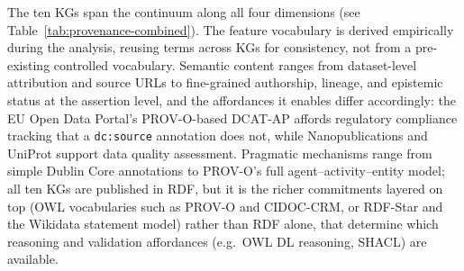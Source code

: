\documentclass[runningheads]{llncs}
\newenvironment{inboth}{}{}
\begin{document}
\begin{inboth}
\begin{sloppypar} %
The ten KGs span the continuum along all four dimensions (see Table~\ref{tab:provenance-combined}).
The feature vocabulary is derived empirically during the analysis, reusing terms across KGs for consistency, not from a pre-existing controlled vocabulary.
Semantic content ranges from dataset-level attribution and source URLs to fine-grained authorship, lineage, and epistemic status at the assertion level, and the affordances it enables differ accordingly: the EU Open Data Portal's PROV-O-based DCAT-AP affords regulatory compliance tracking that a \texttt{dc:source} annotation does not, while Nanopublications and UniProt support data quality assessment.
Pragmatic mechanisms range from simple Dublin Core annotations to PROV-O's full agent--activity--entity model; all ten KGs are published in RDF, but it is the richer commitments layered on top (OWL vocabularies such as PROV-O and CIDOC-CRM, or RDF-Star and the Wikidata statement model) rather than RDF alone, that determine which reasoning and validation affordances (e.g.\ OWL DL reasoning, SHACL) are available.


\end{sloppypar}
\end{inboth}
\end{document}

